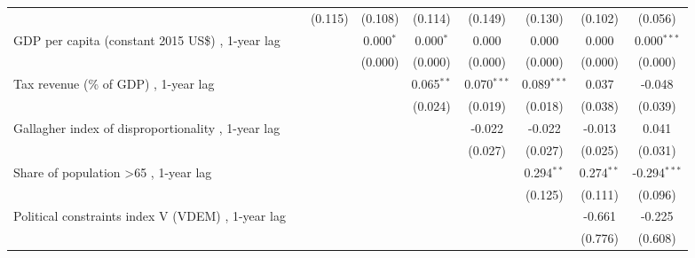\begin{table}[htbp]
\begin{tabular}{lcccccccc}
                                                                                                         &         & (0.115) & (0.108)     & (0.114)      & (0.149)       & (0.130)       & (0.102)      & (0.056)\\   
      GDP per capita (constant 2015 US\$) , 1-year lag                                                   &         &         & 0.000$^{*}$ & 0.000$^{*}$  & 0.000         & 0.000         & 0.000        & 0.000$^{***}$\\   
                                                                                                         &         &         & (0.000)     & (0.000)      & (0.000)       & (0.000)       & (0.000)      & (0.000)\\   
      Tax revenue (\% of GDP) , 1-year lag                                                               &         &         &             & 0.065$^{**}$ & 0.070$^{***}$ & 0.089$^{***}$ & 0.037        & -0.048\\   
                                                                                                         &         &         &             & (0.024)      & (0.019)       & (0.018)       & (0.038)      & (0.039)\\   
      Gallagher index of disproportionality , 1-year lag                                                 &         &         &             &              & -0.022        & -0.022        & -0.013       & 0.041\\   
                                                                                                         &         &         &             &              & (0.027)       & (0.027)       & (0.025)      & (0.031)\\   
      Share of population >65 , 1-year lag                                                               &         &         &             &              &               & 0.294$^{**}$  & 0.274$^{**}$ & -0.294$^{***}$\\   
                                                                                                         &         &         &             &              &               & (0.125)       & (0.111)      & (0.096)\\   
      Political constraints index V (VDEM) , 1-year lag                                                  &         &         &             &              &               &               & -0.661       & -0.225\\   
                                                                                                         &         &         &             &              &               &               & (0.776)      & (0.608)\\   

\end{tabular}
\end{table}
